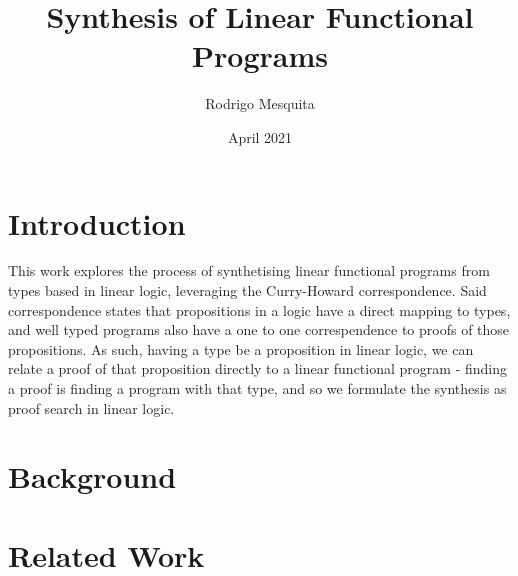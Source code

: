 \documentclass{llncs}
\title{Synthesis of Linear Functional Programs}
\author{Rodrigo Mesquita}
\date{April 2021}
\institute{NOVA School of Science and Technology}
\begin{document}
\maketitle

\section{Introduction}

This work explores the process of synthetising linear functional programs from types based in linear logic, leveraging the Curry-Howard correspondence.
Said correspondence states that propositions in a logic have a direct mapping to types, and well typed programs also have a one to one correspendence to proofs of those propositions.
As such, having a type be a proposition in linear logic, we can relate a proof of that proposition directly to a linear functional program - finding a proof is finding a program with that type, and so we formulate the synthesis as proof search in linear logic.


\section{Background}

\section{Related Work}



\end{document}
